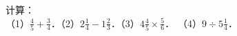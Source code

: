 
计算：\\
（1）$\frac{4}{5}+\frac{3}{4}$．\hspace{6em}（2）$2\frac{1}{4}-1\frac{2}{3}$．\hspace{6em}（3）$4 \frac{4}{5} \times \frac{5}{6}$． \hspace{6em}（4）$9 \div 5 \frac{1}{4}$．\\
